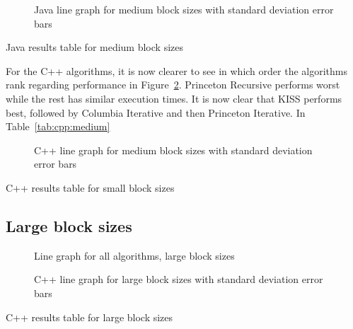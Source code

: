 \begin{figure}
    \centering
    
    \caption{Java line graph for medium block sizes with standard deviation error bars}
    \label{fig:java:line:medium}
\end{figure}
\begin{table}
    \centering
    \caption{Java results table for medium block sizes}
    \label{tab:java:medium}
    
\end{table}

For the C++ algorithms, it is now clearer to see in which order the algorithms rank regarding performance in Figure~\ref{fig:cpp:line:medium}. Princeton Recursive performs worst while the rest has similar execution times. It is now clear that KISS performs best, followed by Columbia Iterative and then Princeton Iterative. In Table~\ref{tab:cpp:medium}

\begin{figure}
    \centering
    
    \caption{C++ line graph for medium block sizes with standard deviation error bars}
    \label{fig:cpp:line:medium}
\end{figure}
\begin{table}
    \centering
    \caption{C++ results table for small block sizes}
    \label{tab:cpp:medium}
    \resizebox{\columnwidth}{!}{
        
    }
\end{table}

\subsection{Large block sizes}

\begin{figure}
    \centering
    
    \caption{Line graph for all algorithms, large block sizes}
    \label{fig:all:line:large}
\end{figure}

\begin{figure}
    \centering
    
    \caption{C++ line graph for large block sizes with standard deviation error bars}
    \label{fig:cpp:line:large}
\end{figure}
\begin{table}
    \centering
    \caption{C++ results table for large block sizes}
    \label{tab:cpp:large}
    \resizebox{\columnwidth}{!}{
        
    }
\end{table}


